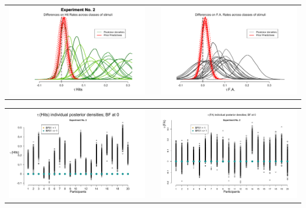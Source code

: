 \documentclass[final]{beamer}
\newlength{\onecolwid}
\newlength{\twocolwid}
\begin{document}
\begin{frame}[t]
\begin{columns}[t]
\begin{column}{\twocolwid}
\begin{columns}[t,totalwidth=\twocolwid]
\begin{column}{\onecolwid}
\begin{alertblock}{}
\begin{center}
\begin{tabular}{ccc}
\includegraphics[width=0.45\linewidth]{Figures/3-Exp2_TauH.pdf}  & \hfill & \includegraphics[width=0.45\linewidth]{Figures/3-Exp2_TauF.pdf}
\end{tabular}
\end{center}

\begin{center}
\begin{tabular}{ccc}
\includegraphics[width=0.45\linewidth]{Figures/3-Exp2_BFH0.pdf}  & \hfill & \includegraphics[width=0.45\linewidth]{Figures/3-Exp2_BFF0.pdf}
\end{tabular}
\end{center}


\end{alertblock}





\end{column}
\end{columns}
\end{column}
\end{columns}
\end{frame}
\end{document}
